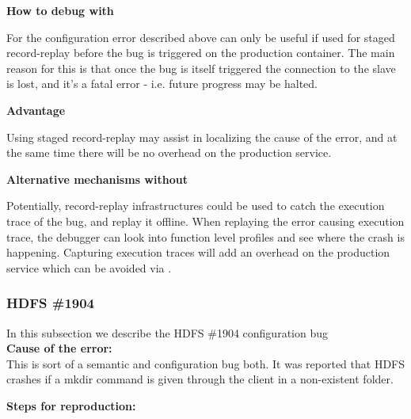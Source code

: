 \noindent \textbf{How to debug with \parikshan}

For the configuration error described above \parikshan can only be useful if used for staged record-replay before the bug is triggered on the production container. The main reason for this is that once the bug is itself triggered the connection to the slave is lost, and it's a fatal error - i.e. future progress may be halted.

\noindent \textbf{Advantage}

Using staged record-replay may assist in localizing the cause of the error, and at the same time there will be no overhead on the production service.

\noindent \textbf{Alternative mechanisms without \parikshan}

Potentially, record-replay infrastructures could be used to catch the execution trace of the bug, and replay it offline. When replaying the error causing execution trace, the debugger can look into function level profiles and see where the crash is happening. Capturing execution traces will add an overhead on the production service which can be avoided via \parikshan.

\subsubsection{HDFS \#1904}

In this subsection we describe the HDFS \#1904 configuration bug \\

\noindent \textbf{Cause of the error:} \\

This is sort of a semantic and configuration bug both. It was reported that HDFS crashes if a mkdir command is given through the client in a non-existent folder.

\noindent \textbf{Steps for reproduction:} \\

